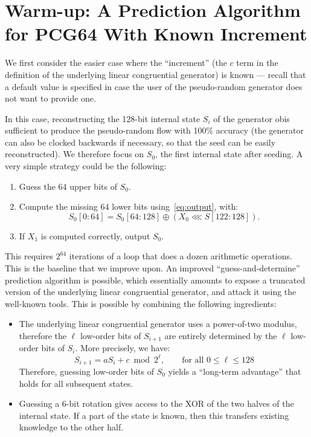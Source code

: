 \documentclass[preprint,svgnames]{iacrtrans}
\begin{document}
\section{Warm-up: A Prediction Algorithm for \textsf{PCG64} With Known Increment}

We first consider the easier case where the ``increment'' (the $c$ term in the
definition of the underlying linear congruential generator) is known --- recall
that a default value is specified in case the user of the pseudo-random
generator does not want to provide one.

In this case, reconstructing the 128-bit internal state $S_i$ of the generator
obis sufficient to produce the pseudo-random flow with 100\% accuracy (the
generator can also be clocked backwards if necessary, so that the seed can be
easily reconstructed). We therefore focus on $S_0$, the first internal state
after seeding. A very simple strategy could be the following:
\begin{enumerate}
\item Guess the 64 upper bits of $S_0$.
\item Compute the missing 64 lower bits using~\eqref{eq:output}, with:
\[
   S_0[0:64] = S_0[64:128] \oplus (X_0  \lll S[122:128]).
\]
\item If $X_1$ is computed correctly, output $S_0$.
\end{enumerate}

This requires $2^{64}$ iterations of a loop that does a dozen arithmetic
operations. This is the baseline that we improve upon. An improved
``guess-and-determine'' prediction algorithm is possible, which essentially
amounts to expose a truncated version of the underlying linear congruential
generator, and attack it using the well-known tools. This is possible by
combining the following ingredients:
\begin{itemize}
\item The underlying linear congruential generator uses a power-of-two modulus,
  therefore the $\ell$ low-order bits of $S_{i+1}$ are entirely determined by
  the $\ell$ low-order bits of $S_i$. More precisely, we have:
  \begin{equation}\label{eq:lcg}
    S_{i+1} = aS_i + c \bmod 2^\ell, \qquad \text{for all } 0 \leq \ell \leq 128
  \end{equation}
  Therefore, guessing low-order bits of $S_0$ yields a ``long-term advantage''
  that holds for all subsequent states.

\item Guessing a 6-bit rotation gives access to the XOR of the two halves of the
  internal state. If a part of the state is known, then this transfers existing
  knowledge to the other half.
\end{itemize}
\end{document}

